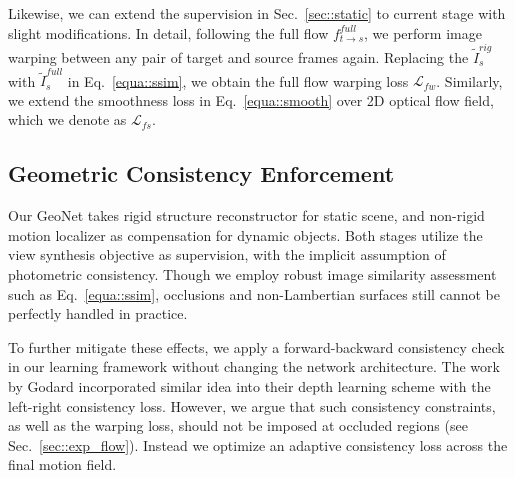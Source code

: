 Likewise, we can extend the supervision in Sec.~\ref{sec::static} to current stage with slight modifications. In detail, following the full flow $f^{full}_{t\to s}$, we perform image warping between any pair of target and source frames again. Replacing the $\tilde{I}_s^{rig}$ with $\tilde{I}_s^{full}$ in Eq.~\eqref{equa::ssim}, we obtain the full flow warping loss $\mathcal{L}_{fw}$. Similarly, we extend the smoothness loss in Eq.~\eqref{equa::smooth} over 2D optical flow field, which we denote as $\mathcal{L}_{fs}$. \iffalse
Still without consistency enforcement, we introduce supervision at this level as follows
\begin{equation}
\mathcal{L}_{t\to s}^{fw}=\sum_{p_t\in I_t}\mathcal{C}(I_t, \tilde{I}_s^{fin})(p_t)
\end{equation}
\begin{equation}
\tilde{I}_s^{fin}(p_t):=I_s(p_t+f_{t\to s}^{fin}(p_t))
\end{equation}
\fi



\subsection{Geometric Consistency Enforcement}
\label{sec::geocst}
Our GeoNet takes rigid structure reconstructor for static scene, and non-rigid motion localizer as compensation for dynamic objects. Both stages utilize the view synthesis objective as supervision, with the implicit assumption of photometric consistency. Though we employ robust image similarity assessment such as Eq.~\eqref{equa::ssim}, occlusions and non-Lambertian surfaces still cannot be perfectly handled in practice.

To further mitigate these effects, we apply a forward-backward consistency check in our learning framework without changing the network architecture. The work by Godard \etal \cite{monodepth17} incorporated similar idea into their depth learning scheme with the left-right consistency loss. However, we argue that such consistency constraints, as well as the warping loss, should not be imposed at occluded regions (see Sec.~\ref{sec::exp_flow}). Instead we optimize an adaptive consistency loss across the final motion field.
 

